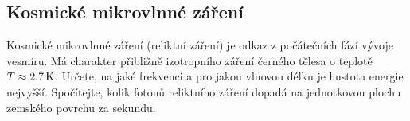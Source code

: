 \subsection{Kosmické mikrovlnné záření}
    Kosmické mikrovlnné záření (reliktní záření) je odkaz z počátečních fází vývoje vesmíru.
    Má charakter přibližně izotropního záření černého tělesa o teplotě $T\approx2,\!7\,\mathrm{{K}}$.
    Určete, na jaké frekvenci a pro jakou vlnovou délku je hustota energie nejvyšší.
    Spočítejte, kolik fotonů reliktního záření dopadá na jednotkovou plochu zemského povrchu za sekundu.